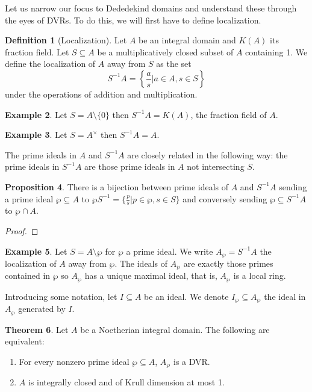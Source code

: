 \documentclass{amsart}
\theoremstyle{definition}
\newtheorem{theorem}{Theorem}[section]
\newtheorem{example}[theorem]{Example}
\newtheorem{proposition}[theorem]{Proposition}
\newtheorem{definition}[theorem]{Definition}
\numberwithin{equation}{section}
\begin{document}
Let us narrow our focus to Dededekind domains and understand these through the eyes of DVRs. To do this, we will first have to define localization. 
\begin{definition}[Localization]
  Let $A$ be an integral domain and $K(A)$ its fraction field. Let $S\subseteq A$ be a multiplicatively closed subset of $A$ containing 1. We define the localization of $A$ away from $S$ as the set 
  $$S^{-1}A=\left\{\frac{a}{s}|a\in A, s\in S\right\}$$
  under the operations of addition and multiplication.
\end{definition}
\begin{example}
  Let $S=A\setminus\{0\}$ then $S^{-1}A=K(A)$, the fraction field of $A$. 
\end{example}
\begin{example}
  Let $S=A^{\times}$ then $S^{-1}A=A$. 
\end{example}
The prime ideals in $A$ and $S^{-1}A$ are closely related in the following way: the prime ideals in $S^{-1}A$ are those prime ideals in $A$ not intersecting $S$. 
\begin{proposition}
  There is a bijection between prime ideals of $A$ and $S^{-1}A$ sending a prime ideal $\wp\subseteq A$ to $\wp S^{-1}=\{\frac{p}{s}|p\in\wp,s\in S\}$ and conversely sending $\wp\subseteq S^{-1}A$ to $\wp\cap A$. 
\end{proposition}
\begin{proof}
  
\end{proof}
\begin{example}
  Let $S=A\setminus\wp$ for $\wp$ a prime ideal. We write $A_{\wp}=S^{-1}A$ the localization of $A$ away from $\wp$. The ideals of $A_{\wp}$ are exactly those primes contained in $\wp$ so $A_{\wp}$ has a unique maximal ideal, that is, $A_{\wp}$ is a local ring. 
\end{example}
Introducing some notation, let $I\subseteq A$ be an ideal. We denote $I_{\wp}\subseteq A_{\wp}$ the ideal in $A_{\wp}$ generated by $I$. 
\begin{theorem}\label{thm: dedekind TFAE}
  Let $A$ be a Noetherian integral domain. The following are equivalent:
  \begin{enumerate}[label=(\roman*)]
    \item For every nonzero prime ideal $\wp\subseteq A$, $A_{\wp}$ is a DVR. 
    \item $A$ is integrally closed and of Krull dimension at most 1. 
  \end{enumerate}
\end{theorem}
\end{document}
